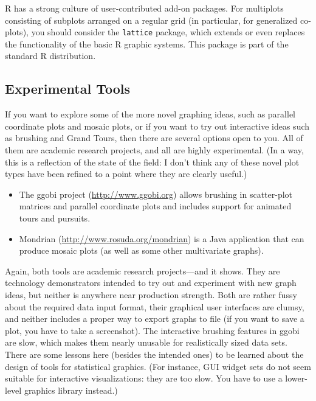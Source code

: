 R has a strong culture of user-contributed add-on packages. For
multiplots consisting of subplots arranged on a regular grid (in
particular, for generalized co-plots), you should consider the
\texttt{lattice} package, which extends or even replaces the
functionality of the basic R graphic systems. This package is part of
the standard R distribution.

\vspace*{-6pt}
\subsection{Experimental Tools}

If you want to explore some of the more novel graphing ideas, such as
parallel coordinate plots and mosaic plots, or if you want to try out
interactive ideas such as brushing and Grand Tours, then there are
several options open to you. All of them are academic research
projects, and all are highly experimental. (In a way, this is a
reflection of the state of the field: I don't think any of these novel
plot types have been refined to a point where they are clearly
useful.)

\begin{itemize}
\item The ggobi project (\url{http://www.ggobi.org}) allows brushing
  in scatter-plot matrices and parallel coordinate plots and includes
  support for animated tours and pursuits.

\item Mondrian (\url{http://www.rosuda.org/mondrian}) is a Java
  application that can produce mosaic plots (as well as some other
  multivariate graphs).
\end{itemize}

Again, both tools are academic research projects---and it shows. They
are technology demonstrators intended to try out and experiment with
new graph ideas, but neither is anywhere near production strength.
Both are rather fussy about the required data input format, their
graphical user interfaces are clumsy, and neither includes a proper way to
export graphs to file (if you want to save a plot, you have to take a
screenshot). The interactive brushing features in ggobi are slow,
which makes them nearly unusable for realistically sized data sets.
There are some lessons here (besides the intended ones) to be learned
about the design of tools for statistical graphics. (For instance, GUI
widget sets do not seem suitable for interactive visualizations: they
are too slow. You have to use a lower-level graphics library instead.)


